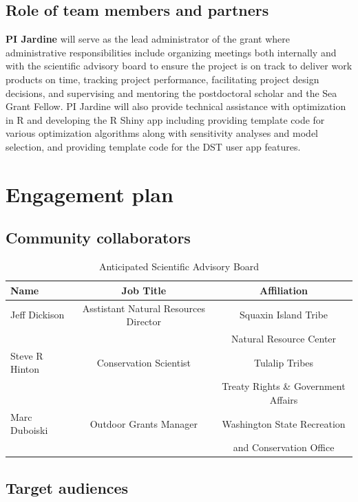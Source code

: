 \documentclass[12pt]{elsarticle}
\begin{document}
\subsection{Role of team members and partners}
\textbf{PI Jardine} will serve as the lead administrator of the grant where administrative responsibilities include organizing meetings both internally and with the scientific advisory board to ensure the project is on track to deliver work products on time, tracking project performance, facilitating project design decisions, and supervising and mentoring the postdoctoral scholar and the Sea Grant Fellow.  PI Jardine will also provide technical assistance with optimization in R and developing the R Shiny app including providing template code for various optimization algorithms along with sensitivity analyses and model selection, and providing template code for the DST user app features.\\


%
\section{Engagement plan}
\subsection{Community collaborators} 

\begin{table}[h]
\caption{Anticipated Scientific Advisory Board \label{tab:sab}}
\centering
\begin{tabular}{lcc}\hline
 Name & Job Title & Affiliation  \\\hline
Jeff Dickison& Asstistant Natural Resources Director &  Squaxin Island Tribe\\
& & Natural Resource Center\\
\rowcolor[gray]{.9} Steve R Hinton &  Conservation Scientist&  Tulalip Tribes  \\
\rowcolor[gray]{.9}& &Treaty Rights \& Government Affairs\\
Marc Duboiski & Outdoor Grants Manager & Washington State Recreation\\
& & and Conservation Office\\\hline
\end{tabular}
\end{table}


\subsection{Target audiences}
\end{document}
